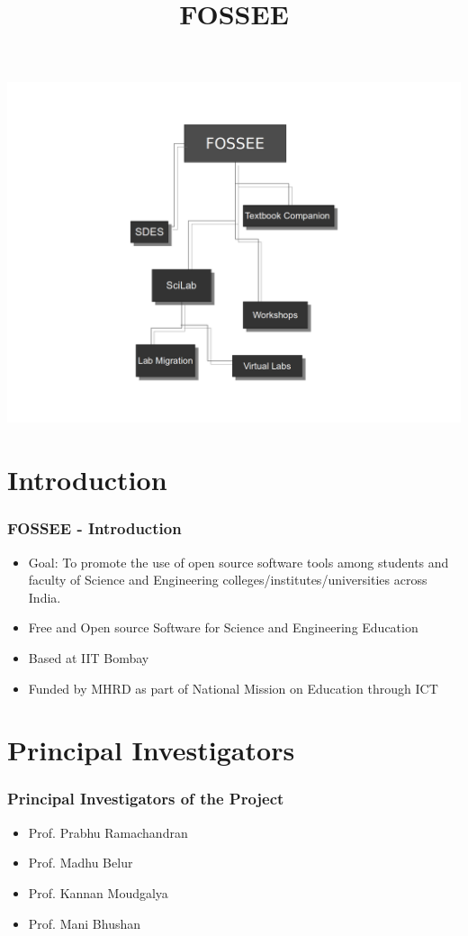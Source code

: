 \documentclass{beamer}
\title{FOSSEE}
\institute[IIT Bombay] {\Large{IIT Bombay}}
\date{}
\begin{document}
\begin{frame}
   \begin{center}
   \maketitle
   \includegraphics[scale=2]{overview.png}    
   \end{center}  
\end{frame}


\section{Introduction}
\begin{frame}
  \frametitle{{FOSSEE} - Introduction}
  \begin{itemize}
  \item Goal: To promote the use of open source software tools among students and faculty of Science and Engineering colleges/institutes/universities across India.
  \item Free and Open source Software for Science and Engineering Education 
  \item Based at IIT Bombay
  \item Funded by MHRD as part of National Mission on Education through ICT
  \end{itemize}  
\end{frame}

\section{Principal Investigators}
\begin{frame}
  \frametitle{Principal Investigators of the Project}
  \begin{itemize}
  \item Prof. Prabhu Ramachandran
  \item Prof. Madhu Belur
  \item Prof. Kannan Moudgalya
  \item Prof. Mani Bhushan
  \end{itemize}
\end{frame}
\end{document}
